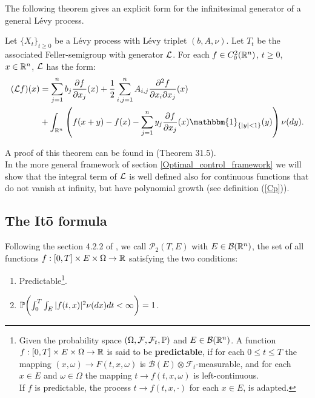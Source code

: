 The following theorem gives an explicit form for the infinitesimal generator 
of a general Lévy process.

\begin{Theorem}\label{Inf_gen_theorem}
 Let $\{X_t\}_{t \ge 0}$ be a Lévy process with Lévy triplet $(b,A,\nu)$. Let $T_t$ be the associated Feller-semigroup
 with generator $\mathcal{L}$. For each $f\in C_0^{2}(\mathbb{R}^n)$, $t\geq0$, $x\in \mathbb{R}^n$, 
  $\mathcal{L}$ has the form:
 \begin{align}\label{genLevy}
  (\LL f)(x) &=  \sum_{j=1}^n b_j \frac{\partial f}{\partial x_j}(x) +
  \frac{1}{2} \sum_{i,j=1}^n A_{i,j} \frac{\partial^2 f}{\partial x_i \partial x_j}(x)\\  
           & + \int_{\R^n} \left( f(x+y) - f(x) - \sum_{j=1}^n y_j \frac{\partial f}{\partial x_j}(x) 
           \mathbbm{1}_{\{ |y|<1 \}}(y) \right) \nu(dy).   \nonumber
  \end{align}
\end{Theorem}
A proof of this theorem can be found in \cite{Sato} (Theorem 31.5).\\

\noindent
In the more general framework of section \ref{Optimal_control_framework} we will show that the integral term of 
$\mathcal{L}$ is well defined also for continuous functions that do not vanish at infinity, but have 
polynomial growth (see definition (\ref{Cp})). 


  
\subsection{The It\={o} formula} 

Following the section 4.2.2 of \cite{Applebaum}, we call $\mathcal{P}_2(T,E)$ with $E \in \mathcal{B}(\mathbb{R}^n)$, 
the set of all functions $f:[0,T]\times E \times \Omega \to \mathbb{R}$ satisfying the two conditions:
\begin{enumerate}
 \item Predictable\footnote{Given the probability space $(\Omega,\mathcal{F},\mathcal{F}_t,\mathbb{P})$ and $E \in \mathcal{B}(\mathbb{R}^n)$. A function $f:[0,T]\times E \times \Omega \to \mathbb{R}$
 is said to be \textbf{predictable}, if for each $0 \leq t \leq T$ the mapping $(x,\omega) \to F(t,x,\omega)$ is $\mathcal{B}(E)\otimes \mathcal{F}_t$-measurable,
 and for each $x\in E$ and $\omega \in \Omega$ the mapping $t \to f(t,x,\omega)$ is left-continuous.\\
 If $f$ is predictable, the process $t \to f(t,x,\cdot)$ for each $x \in E$, is adapted.}.
 \item  $\mathbb{P} \biggl( \int_0^T \int_E |f(t,x)|^2 \nu(dx) dt  <\infty \biggr) = 1 $.
\end{enumerate}

